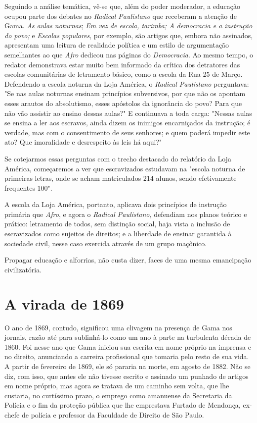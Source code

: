 Seguindo a análise temática, vê-se que, além do poder moderador, a
educação ocupou parte dos debates no \emph{Radical Paulistano} que
receberam a atenção de Gama. \emph{As aulas noturnas}; \emph{Em vez de
escola, tarimba; A democracia e a instrução do povo;} e \emph{Escolas
populares}, por exemplo, são artigos que, embora não assinados,
apresentam uma leitura de realidade política e um estilo de argumentação
semelhantes ao que \emph{Afro} dedicou nas páginas do \emph{Democracia}.
Ao mesmo tempo, o redator demonstrava estar muito bem informado da
crítica dos detratores das escolas comunitárias de letramento básico,
como a escola da Rua 25 de Março. Defendendo a escola noturna da Loja
América, o \emph{Radical Paulistano} perguntava: "Se nas aulas noturnas
ensinam princípios subversivos, por que não os apontam esses arautos do
absolutismo, esses apóstolos da ignorância do povo? Para que não vão
assistir ao ensino dessas aulas?" E continuava a toda carga: "Nessas
aulas se ensina a ler aos escravos, ainda dizem os inimigos encarniçados
da instrução; é verdade, mas com o consentimento de seus senhores; e
quem poderá impedir este ato? Que imoralidade e desrespeito às leis há
aqui?"

Se cotejarmos essas perguntas com o trecho destacado do relatório da
Loja América, começaremos a ver que escravizados estudavam na "escola
noturna de primeiras letras, onde se acham matriculados 214 alunos,
sendo efetivamente frequentes 100".

A escola da Loja América, portanto, aplicava dois princípios de
instrução primária que \emph{Afro}, e agora o \emph{Radical Paulistano,}
defendiam nos planos teórico e prático: letramento de todos, sem
distinção social, haja vista a inclusão de escravizados como sujeitos de
direitos; e a liberdade de ensinar garantida à sociedade civil, nesse
caso exercida através de um grupo maçônico.

Propagar educação e alforrias, não custa dizer, faces de uma mesma
emancipação civilizatória.

\section{A virada de 1869}

O ano de 1869, contudo, significou uma clivagem na presença de Gama nos
jornais, razão até para sublinhá-lo como um ano à parte na turbulenta
década de 1860. Foi nesse ano que Gama iniciou sua escrita em nome
próprio na imprensa e no direito, anunciando a carreira profissional que
tomaria pelo resto de sua vida. A partir de fevereiro de 1869, ele só
pararia na morte, em agosto de 1882. Não se diz, com isso, que antes ele
não tivesse escrito e assinado um punhado de artigos em nome próprio,
mas agora se tratava de um caminho sem volta, que lhe custaria, no
curtíssimo prazo, o emprego como amanuense da Secretaria da Polícia e o
fim da proteção pública que lhe emprestava Furtado de Mendonça, ex-chefe
de polícia e professor da Faculdade de Direito de São Paulo.

